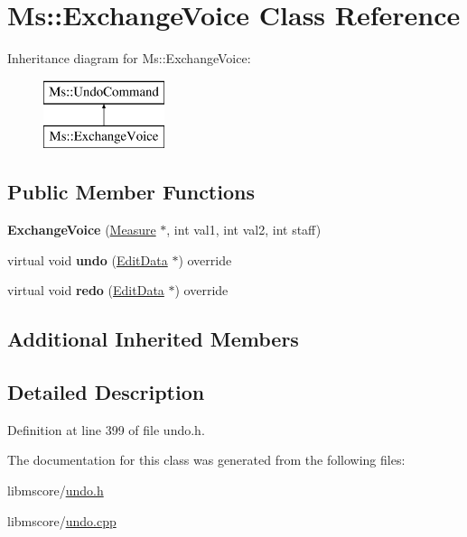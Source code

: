 \hypertarget{class_ms_1_1_exchange_voice}{}\section{Ms\+:\+:Exchange\+Voice Class Reference}
\label{class_ms_1_1_exchange_voice}
Inheritance diagram for Ms\+:\+:Exchange\+Voice\+:\begin{figure}[H]
\begin{center}
\leavevmode
\includegraphics[height=2.000000cm]{class_ms_1_1_exchange_voice}
\end{center}
\end{figure}
\subsection*{Public Member Functions}
\begin{DoxyCompactItemize}
\item 
\mbox{\label{class_ms_1_1_exchange_voice_aaf821864989c7b5b5e903778f779e8a2}} 
{\bfseries Exchange\+Voice} (\hyperlink{class_ms_1_1_measure}{Measure} $\ast$, int val1, int val2, int staff)
\item 
\mbox{\label{class_ms_1_1_exchange_voice_a1923005f409e8b9f6e99324814449b00}} 
virtual void {\bfseries undo} (\hyperlink{class_ms_1_1_edit_data}{Edit\+Data} $\ast$) override
\item 
\mbox{\label{class_ms_1_1_exchange_voice_a59d468d9c16ec9d1357e41345297dc18}} 
virtual void {\bfseries redo} (\hyperlink{class_ms_1_1_edit_data}{Edit\+Data} $\ast$) override
\end{DoxyCompactItemize}
\subsection*{Additional Inherited Members}


\subsection{Detailed Description}


Definition at line 399 of file undo.\+h.



The documentation for this class was generated from the following files\+:\begin{DoxyCompactItemize}
\item 
libmscore/\hyperlink{undo_8h}{undo.\+h}\item 
libmscore/\hyperlink{undo_8cpp}{undo.\+cpp}\end{DoxyCompactItemize}
